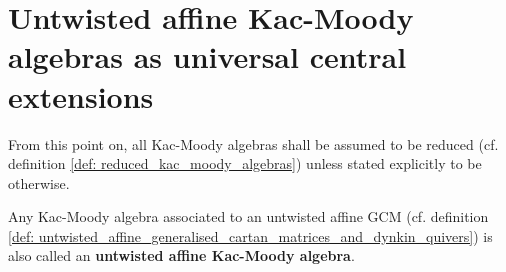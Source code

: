 \section{Untwisted affine Kac-Moody algebras as universal central extensions}
    \begin{convention}
        From this point on, all Kac-Moody algebras shall be assumed to be reduced (cf. definition \ref{def: reduced_kac_moody_algebras}) unless stated explicitly to be otherwise.
    \end{convention}

    \begin{definition} \label{def: untwisted_affine_kac_moody_algebras}
        Any Kac-Moody algebra associated to an untwisted affine GCM (cf. definition \ref{def: untwisted_affine_generalised_cartan_matrices_and_dynkin_quivers}) is also called an \textbf{untwisted affine Kac-Moody algebra}.
    \end{definition}
